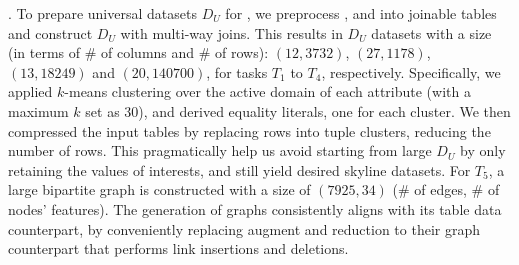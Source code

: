.
To prepare %
universal datasets $D_U$ %
for \modis, we %
preprocess \kaggle, \open and \hf 
into joinable tables and construct 
$D_U$ with multi-way joins. 
This results in $D_U$ 
datasets with a size (in terms of 
\# of columns and \# of rows):
$(12, 3732)$, $(27, 1178)$, $(13, 18249)$ 
and $(20, 140700)$, for 
tasks $T_1$ to $T_4$, respectively. 
Specifically, we applied 
$k$-means clustering over 
the active domain of 
each %
attribute (with a maximum $k$ 
set as $30$), and 
derived equality literals, 
one for each cluster. 
We then compressed the 
input tables by replacing 
rows into tuple clusters, reducing 
the number of rows. 
This pragmatically help us 
avoid starting from large 
$D_U$ by only 
retaining 
the values of interests,   
and still yield desired 
skyline datasets. 
For $T_5$, a 
large bipartite graph 
is constructed 
with a size of 
$(7925, 34)$ (\# of edges, \# of nodes' features). 
The generation of graphs consistently aligns with its table data counterpart, 
by conveniently replacing augment and reduction to their graph counterpart 
that performs link insertions and deletions. 








